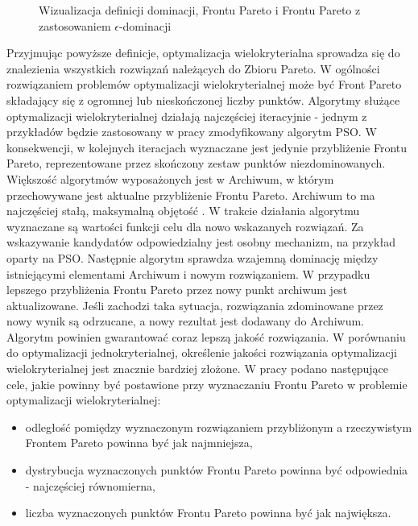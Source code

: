 \begin{figure}[hbt!]
	\centering
	\captionsetup{justification=centering}
	\caption{Wizualizacja definicji dominacji, Frontu Pareto i Frontu Pareto z zastosowaniem $\epsilon$-dominacji}
	\label{fig: PSO_pareto_visualization}
\end{figure}

Przyjmując powyższe definicje, optymalizacja wielokryterialna sprowadza się do znalezienia wszystkich rozwiązań należących do Zbioru Pareto. W ogólności rozwiązaniem problemów optymalizacji wielokryterialnej może być Front Pareto składający się z ogromnej lub nieskończonej liczby punktów. Algorytmy służące optymalizacji wielokryterialnej działają najczęściej iteracyjnie - jednym z przykładów będzie zastosowany w pracy zmodyfikowany algorytm PSO. W konsekwencji, w kolejnych iteracjach wyznaczane jest jedynie przybliżenie Frontu Pareto, reprezentowane przez skończony zestaw punktów niezdominowanych. Większość algorytmów wyposażonych jest w Archiwum, w którym przechowywane jest aktualne przybliżenie Frontu Pareto. Archiwum to ma najczęściej stałą, maksymalną objętość \parencite{Banach2017}. W trakcie działania algorytmu wyznaczane są wartości funkcji celu dla nowo wskazanych rozwiązań. Za wskazywanie kandydatów odpowiedzialny jest osobny mechanizm, na przykład oparty na PSO. Następnie algorytm sprawdza wzajemną dominację między istniejącymi elementami Archiwum i nowym rozwiązaniem. W przypadku lepszego przybliżenia Frontu Pareto przez nowy punkt archiwum jest aktualizowane. Jeśli zachodzi taka sytuacja, rozwiązania zdominowane przez nowy wynik są odrzucane, a nowy rezultat jest dodawany do Archiwum. Algorytm powinien gwarantować coraz lepszą jakość rozwiązania. W porównaniu do optymalizacji jednokryterialnej, określenie jakości rozwiązania optymalizacji wielokryterialnej jest znacznie bardziej złożone. W pracy \cite{Zitzler2000} podano następujące cele, jakie powinny być postawione przy wyznaczaniu Frontu Pareto w problemie optymalizacji wielokryterialnej:
\begin{itemize}
	\item odległość pomiędzy wyznaczonym rozwiązaniem przybliżonym a rzeczywistym Frontem Pareto powinna być jak najmniejsza,
	\item dystrybucja wyznaczonych punktów Frontu Pareto powinna być odpowiednia - najczęściej równomierna,
	\item liczba wyznaczonych punktów Frontu Pareto powinna być jak największa.
\end{itemize}

